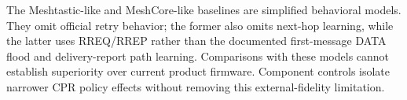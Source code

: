 The Meshtastic-like and MeshCore-like baselines are simplified behavioral
models. They omit official retry behavior; the former also omits next-hop
learning, while the latter uses RREQ/RREP rather than the documented
first-message DATA flood and delivery-report path learning. Comparisons
with these models cannot establish superiority over current product
firmware. Component controls isolate narrower CPR policy effects without
removing this external-fidelity limitation.

